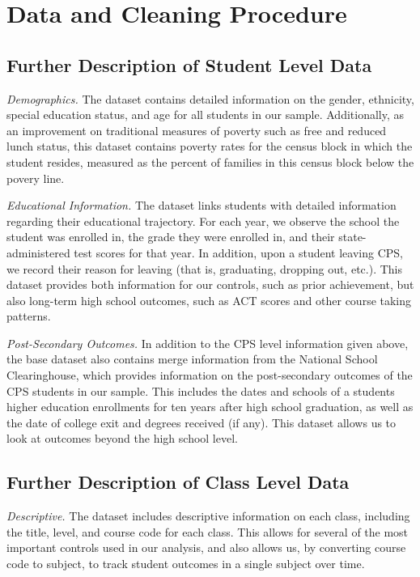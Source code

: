 \documentclass[../thesis_main.tex]{subfiles}
\begin{document}
\doublespacing
\section{Data and Cleaning Procedure}
\label{appendix:data}

\subsection{Further Description of Student Level Data}

\textit{Demographics.} The dataset contains detailed information on the gender, ethnicity, special education status, and age for all students in our sample. Additionally, as an improvement on traditional measures of poverty such as free and reduced lunch status, this dataset contains poverty rates for the census block in which the student resides, measured as the percent of families in this census block below the povery line.

\textit{Educational Information.} The dataset links students with detailed information regarding their educational trajectory. For each year, we observe the school the student was enrolled in, the grade they were enrolled in, and their state-administered test scores for that year. In addition, upon a student leaving CPS, we record their reason for leaving (that is, graduating, dropping out, etc.). This dataset provides both information for our controls, such as prior achievement, but also long-term high school outcomes, such as ACT scores and other course taking patterns. 

\textit{Post-Secondary Outcomes.} In addition to the CPS level information given above, the base dataset also contains merge information from the National School Clearinghouse, which provides information on the post-secondary outcomes of the CPS students in our sample. This includes the dates and schools of a students higher education enrollments for ten years after high school graduation, as well as the date of college exit and degrees received (if any). This dataset allows us to look at outcomes beyond the high school level. 

\subsection{Further Description of Class Level Data}

\textit{Descriptive.} The dataset includes descriptive information on each class, including the title, level, and course code for each class. This allows for several of the most important controls used in our analysis, and also allows us, by converting course code to subject, to track student outcomes in a single subject over time. 
\end{document}
